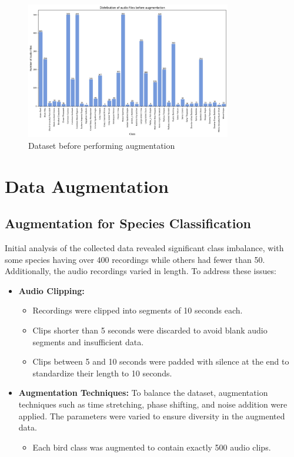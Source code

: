 \begin{figure}[h!]
    \centering
    \includegraphics[width=0.8\textwidth]{images/before_augmentation.png}
    \caption{Dataset before performing augmentation}
    \label{fig:visualization}
\end{figure}

\section{Data Augmentation}
\subsection{Augmentation for Species Classification}
Initial analysis of the collected data revealed significant class imbalance,
with some species having over 400 recordings while others had fewer than 50.
Additionally, the audio recordings varied in length. To address these issues:
\begin{itemize}
    \item \textbf{Audio Clipping:}
          \begin{itemize}
              \item Recordings were clipped into segments of 10 seconds each.
              \item Clips shorter than 5 seconds were discarded to avoid blank audio segments and
                    insufficient data.
              \item Clips between 5 and 10 seconds were padded with silence at the end to
                    standardize their length to 10 seconds.
          \end{itemize}

    \item \textbf{Augmentation Techniques:}
          To balance the dataset, augmentation techniques such as time stretching, phase shifting, and noise addition were applied. The parameters were varied to ensure diversity in the augmented data.
          \begin{itemize}
              \item Each bird class was augmented to contain exactly 500 audio clips.
          \end{itemize}
\end{itemize}

